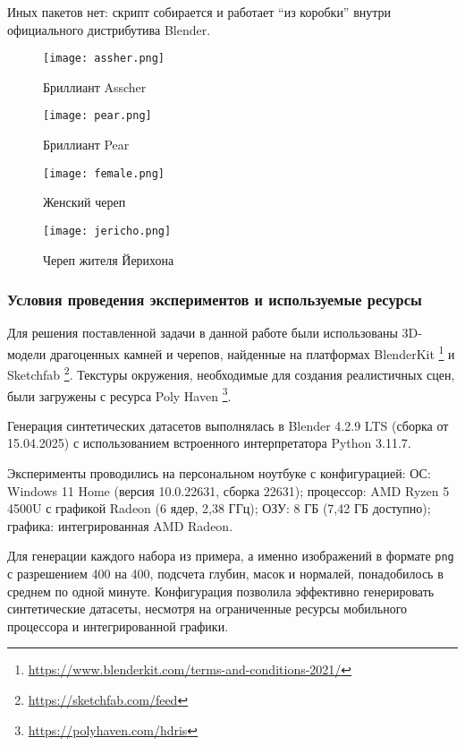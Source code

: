 Иных пакетов нет: скрипт собирается и работает ``из коробки'' внутри
официального дистрибутива Blender.

\begin{figure}[t]
\begin{minipage}{0.5\linewidth}
	\centering
	\texttt{[image: assher.png]}
	\caption{Бриллиант Asscher}
\end{minipage}%
\begin{minipage}{0.5\linewidth}
	\centering
	\texttt{[image: pear.png]}
	\caption{Бриллиант Pear}
\end{minipage}

\vspace{0.4cm}

\begin{minipage}{0.5\linewidth}
	\centering
	\texttt{[image: female.png]}
	\caption{Женский череп}
\end{minipage}%
\begin{minipage}{0.5\linewidth}
	\centering
	\texttt{[image: jericho.png]}
	\caption{Череп жителя Йерихона}
\end{minipage}
\end{figure}

\subsubsection*{Условия проведения экспериментов и используемые ресурсы}

Для решения поставленной задачи в данной работе были использованы 3D-модели
драгоценных камней и черепов, найденные на платформах BlenderKit
\footnote{\url{https://www.blenderkit.com/terms-and-conditions-2021/}} и Sketchfab
\footnote{\url{https://sketchfab.com/feed}}. Текстуры окружения, необходимые для создания
реалистичных сцен, были загружены с ресурса Poly Haven
\footnote{\url{https://polyhaven.com/hdris}}.

Генерация синтетических датасетов выполнялась в Blender 4.2.9 LTS (сборка от
15.04.2025) с использованием встроенного интерпретатора Python 3.11.7.

Эксперименты проводились на персональном ноутбуке с конфигурацией: ОС: Windows
11 Home (версия 10.0.22631, сборка 22631); процессор: AMD Ryzen 5 4500U с
графикой Radeon (6 ядер, 2,38 ГГц); ОЗУ: 8 ГБ (7,42 ГБ доступно); графика:
интегрированная AMD Radeon.

Для генерации каждого набора из примера, а именно изображений в формате
\texttt{png} с разрешением 400 на 400, подсчета глубин, масок и нормалей,
понадобилось в среднем по одной минуте. Конфигурация позволила эффективно
генерировать синтетические датасеты, несмотря на ограниченные ресурсы мобильного
процессора и интегрированной графики.

